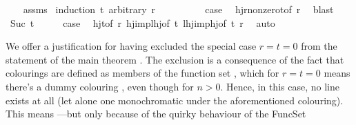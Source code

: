 \begin{isabellebody}
%
\isadelimproof
\ \ %
\endisadelimproof
%
\isatagproof
{}\isamarkupfalse%
\ assms\isanewline
{}\isamarkupfalse%
\ {\isacharparenleft}{\kern0pt}induction\ t\ arbitrary{\isacharcolon}{\kern0pt}\ r{\isacharparenright}{\kern0pt}\isanewline
\ \ \isamarkupfalse%
\ {}\isanewline
\ \ \isamarkupfalse%
\ \isamarkupfalse%
\ {\isacharquery}{\kern0pt}case\ \isamarkupfalse%
\ hj{\isacharunderscore}{\kern0pt}r{\isacharunderscore}{\kern0pt}nonzero{\isacharunderscore}{\kern0pt}t{\isacharunderscore}{\kern0pt}{}{\isacharbrackleft}{\kern0pt}of\ r{\isacharbrackright}{\kern0pt}\ \isamarkupfalse%
\ blast\isanewline
{}\isamarkupfalse%
\isanewline
\ \ \isamarkupfalse%
\ {\isacharparenleft}{\kern0pt}Suc\ t{\isacharparenright}{\kern0pt}\isanewline
\ \ \isamarkupfalse%
\ \isamarkupfalse%
\ {\isacharquery}{\kern0pt}case\ \isamarkupfalse%
\ hj{\isacharunderscore}{\kern0pt}t{\isacharunderscore}{\kern0pt}{}{\isacharbrackleft}{\kern0pt}of\ r{\isacharbrackright}{\kern0pt}\ hj{\isacharunderscore}{\kern0pt}imp{\isacharunderscore}{\kern0pt}lhj{\isacharbrackleft}{\kern0pt}of\ t{\isacharbrackright}{\kern0pt}\ lhj{\isacharunderscore}{\kern0pt}imp{\isacharunderscore}{\kern0pt}hj{\isacharbrackleft}{\kern0pt}of\ t\ r{\isacharbrackright}{\kern0pt}\ \isamarkupfalse%
\ auto\isanewline
{}\isamarkupfalse%
%
\endisatagproof
{\isafoldproof}%
%
\isadelimproof
%
\endisadelimproof
%
\begin{isamarkuptext}%
We offer a justification for having excluded the special case $r = t = 0$ from the statement of the main
theorem . The exclusion is a consequence of the fact that colourings are defined as members
of the function set , which for $r = t = 0$ means there's a dummy
colouring , even though  for $n > 0$.
Hence, in this case, no line exists at all (let alone one monochromatic under the aforementioned colouring). This means
---but only because of the quirky behaviour of the FuncSet

\end{isamarkuptext}
\end{isabellebody}
